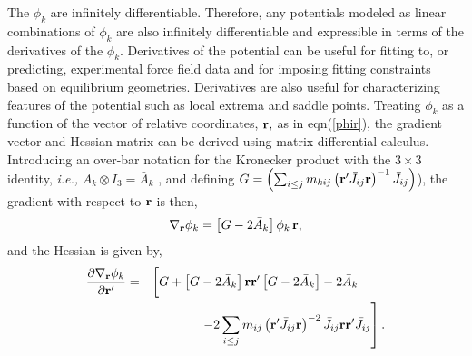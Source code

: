 The $\phi _k$ are infinitely differentiable. Therefore, any potentials
modeled as linear combinations of $\phi _k$ are also infinitely
differentiable and expressible in terms of the derivatives of the $\phi _k$.
Derivatives of the potential can be useful for fitting to, or predicting,
experimental force field data and for imposing fitting constraints based on
equilibrium geometries. Derivatives are also useful for characterizing
features of the potential such as local extrema and saddle points. Treating $%
\phi _k$ as a function of the vector of relative coordinates, ${\bf r,}$ as
in eqn(\ref{phir}), the gradient vector and Hessian matrix can be derived
using matrix differential calculus\cite{Kinghorn95a}. Introducing an
over-bar notation for the Kronecker product with the $3\times 3$ identity, 
{\it i.e.,} $A_k\otimes I_3=\bar{A}_k\,\,$, and defining $G=\left(
\sum_{i\leq j}m_{kij}\left( {\bf r}^{\prime }\bar{J}_{ij}{\bf r}\right) ^{-1}%
\bar{J}_{ij}\right) $), the gradient with respect to ${\bf r} $ is then, 
\begin{equation}
\nabla _{{\bf r}}\phi _k=\left[ G-2\bar{A}_k\right] \phi _k\,{\bf r,}
\end{equation}
and the Hessian is given by, 
\begin{eqnarray}
\frac{\partial \nabla _{{\bf r}}\phi _k}{\partial {\bf r}^{\prime }}
&=&\left[ G+\left[ G-2\bar{A}_k\right] {\bf rr}^{\prime }\left[ G-2\bar{A}%
_k\right] -2\bar{A}_k\mathstrut \strut 
\begin{array}{ll}
&  \\ 
& 
\end{array}
\right.  \nonumber \\
&&\left. -2\sum_{i\leq j}m_{ij}\left( {\bf r}^{\prime }\bar{J}_{ij}{\bf r}%
\right) ^{-2}\bar{J}_{ij}{\bf rr}^{\prime }\bar{J}_{ij}\right] .
\end{eqnarray}

